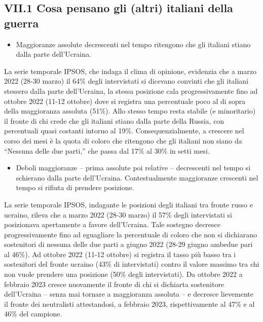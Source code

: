 \documentclass[
  openany]{book}
\providecommand{\tightlist}{%
  \setlength{\itemsep}{0pt}\setlength{\parskip}{0pt}}
\begin{document}
\hypertarget{vii.1-cosa-pensano-gli-altri-italiani-della-guerra}{%
\subsection{VII.1 Cosa pensano gli (altri) italiani della guerra}\label{vii.1-cosa-pensano-gli-altri-italiani-della-guerra}}

\begin{itemize}
\tightlist
\item
  Maggioranze assolute decrescenti nel tempo ritengono che gli italiani stiano dalla parte dell'Ucraina.
\end{itemize}

La serie temporale IPSOS, che indaga il clima di opinione, evidenzia che a marzo 2022 (28-30 marzo) il 64\% degli intervistati si dicevano convinti che gli italiani stessero dalla parte dell'Ucraina, la stessa posizione cala progressivamente fino ad ottobre 2022 (11-12 ottobre) dove si registra una percentuale poco al di sopra della maggioranza assoluta (51\%). Allo stesso tempo resta stabile (e minoritario) il fronte di chi crede che gli italiani stiano dalla parte della Russia, con percentuali quasi costanti intorno al 19\%. Consequenzialmente, a crescere nel corso dei mesi è la quota di coloro che ritengono che gli italiani non siano da ``Nessuna delle due parti,'' che passa dal 17\% al 30\% in setti mesi.

\begin{itemize}
\tightlist
\item
  Deboli maggioranze -- prima assolute poi relative -- decrescenti nel tempo si schierano dalla parte dell'Ucraina. Contestualmente maggioranze crescenti nel tempo si rifiuta di prendere posizione.
\end{itemize}

La serie temporale IPSOS, indagante le posizioni degli italiani tra fronte russo e ucraino, rileva che a marzo 2022 (28-30 marzo) il 57\% degli intervistati si posizionava apertamente a favore dell'Ucraina. Tale sostegno decresce progressivamente fino ad eguagliare la percentuale di coloro che non si dichiarano sostenitori di nessuna delle due parti a giugno 2022 (28-29 giugno ambedue pari al 46\%). Ad ottobre 2022 (11-12 ottobre) si registra il tasso più basso tra i sostenitori del fronte ucraino (43\% di intervistati) contro il valore massimo tra chi non vuole prendere una posizione (50\% degli intervistati). Da ottobre 2022 a febbraio 2023 cresce nuovamente il fronte di chi si dichiarta sostenitore dell'Ucraina -- senza mai tornare a maggioranza assoluta -- e decresce lievemente il fronte dei neutralisti attestandosi, a febbraio 2023, rispettivamente al 47\% e al 46\% del campione.
\end{document}
